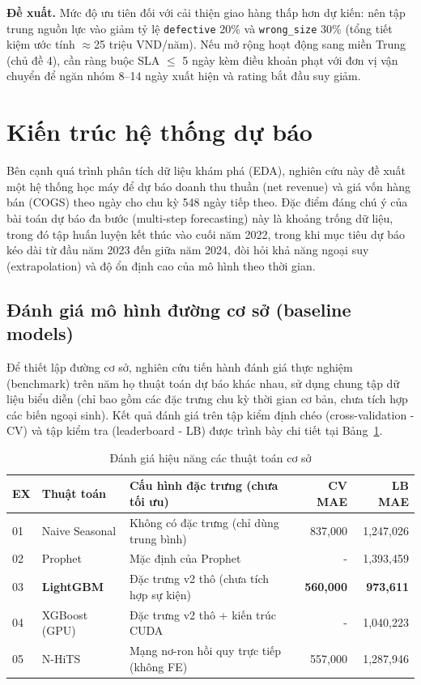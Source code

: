 \documentclass{article}
\begin{document}
\textbf{Đề xuất.} Mức độ ưu tiên đối với cải thiện giao hàng thấp hơn dự kiến: nên tập trung nguồn lực vào giảm tỷ lệ \texttt{defective} 20\% và \texttt{wrong\_size} 30\% (tổng tiết kiệm ước tính $\approx$25 triệu VND/năm). Nếu mở rộng hoạt động sang miền Trung (chủ đề 4), cần ràng buộc SLA $\leq$ 5 ngày kèm điều khoản phạt với đơn vị vận chuyển để ngăn nhóm 8--14 ngày xuất hiện và rating bắt đầu suy giảm.

\section{Kiến trúc hệ thống dự báo}
\label{sec:modeling}

Bên cạnh quá trình phân tích dữ liệu khám phá (EDA), nghiên cứu này đề xuất một hệ thống học máy để dự báo doanh thu thuần (net revenue) và giá vốn hàng bán (COGS) theo ngày cho chu kỳ 548 ngày tiếp theo. Đặc điểm đáng chú ý của bài toán dự báo đa bước (multi-step forecasting) này là khoảng trống dữ liệu, trong đó tập huấn luyện kết thúc vào cuối năm 2022, trong khi mục tiêu dự báo kéo dài từ đầu năm 2023 đến giữa năm 2024, đòi hỏi khả năng ngoại suy (extrapolation) và độ ổn định cao của mô hình theo thời gian.

\subsection{Đánh giá mô hình đường cơ sở (baseline models)}
Để thiết lập đường cơ sở, nghiên cứu tiến hành đánh giá thực nghiệm (benchmark) trên năm họ thuật toán dự báo khác nhau, sử dụng chung tập dữ liệu biểu diễn (chỉ bao gồm các đặc trưng chu kỳ thời gian cơ bản, chưa tích hợp các biến ngoại sinh). Kết quả đánh giá trên tập kiểm định chéo (cross-validation - CV) và tập kiểm tra (leaderboard - LB) được trình bày chi tiết tại Bảng~\ref{tab:baselines}.

\begin{table}[H]
\caption{Đánh giá hiệu năng các thuật toán cơ sở}
\label{tab:baselines}
\centering
\small
\begin{tabular}{@{}llp{5.5cm}rr@{}}
\toprule
EX & Thuật toán & Cấu hình đặc trưng (chưa tối ưu) & CV MAE & LB MAE \\
\midrule
01 & Naive Seasonal & Không có đặc trưng (chỉ dùng trung bình) & 837,000 & 1,247,026 \\
02 & Prophet & Mặc định của Prophet & - & 1,393,459 \\
03 & \textbf{LightGBM} & Đặc trưng v2 thô (chưa tích hợp sự kiện) & \textbf{560,000} & \textbf{973,611} \\
04 & XGBoost (GPU) & Đặc trưng v2 thô + kiến trúc CUDA & - & 1,040,223 \\
05 & N-HiTS & Mạng nơ-ron hồi quy trực tiếp (không FE) & 557,000 & 1,287,946 \\
\bottomrule
\end{tabular}
\end{table}
\end{document}
